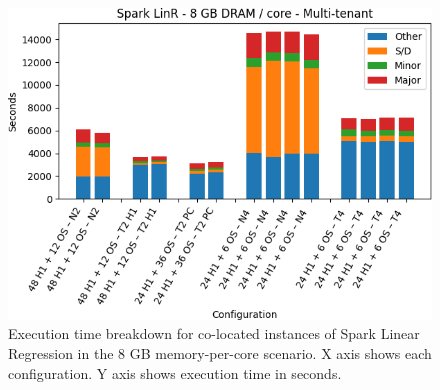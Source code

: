 \begin{figure}[thbp]

	\centering
    \includegraphics[width=\linewidth]{./fig/linr128.png}
    \caption{Execution time breakdown for co-located instances of Spark
    Linear Regression in the 8 GB memory-per-core scenario. X axis shows each configuration.
Y axis shows execution time in seconds.}
    \label{fig:linr128}
\end{figure}
\fi
